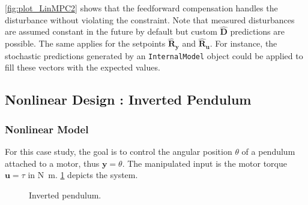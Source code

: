 \cref{fig:plot_LinMPC2} shows that the feedforward compensation handles the disturbance without violating the constraint. Note that measured disturbances are assumed constant in the future by default but custom $\mathbf{\hat{D}}$ predictions are possible. The same applies for the setpoints $\mathbf{\hat{R}_y}$ and $\mathbf{\hat{R}_u}$. For instance, the stochastic predictions generated by an \texttt{InternalModel} object could be applied to fill these vectors with the expected values.

\subsection{Nonlinear Design : Inverted Pendulum}
\label{sec.nonlinear_design}

\subsubsection{Nonlinear Model}

For this case study, the goal is to control the angular position $\theta$ of a pendulum attached to a motor, thus $\mathbf{y} = \theta$. The manipulated input is the motor torque $\mathbf{u} = \tau$ in \si{\newton\meter}. \cref{fig:pendulum} depicts the system. 

\begin{figure}
    \centering
    \caption{Inverted pendulum.}
    
    \label{fig:pendulum}
\end{figure}

